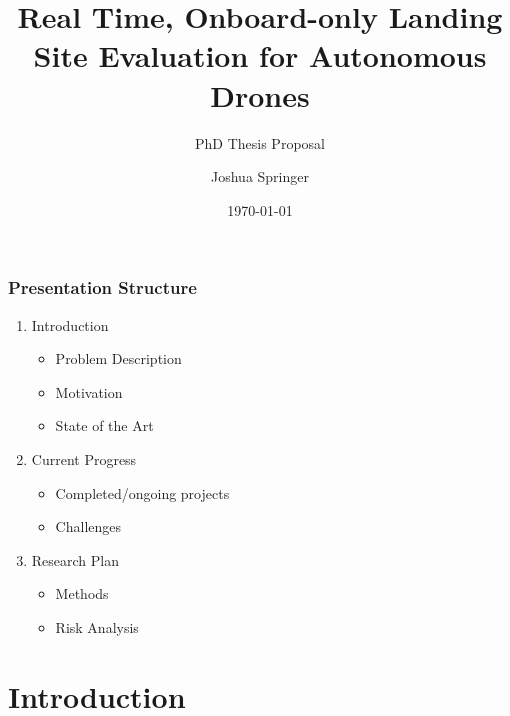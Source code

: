 \documentclass[aspectratio=169]{rubeamer}
\title[RU Presentation]{Real Time, Onboard-only Landing Site Evaluation for Autonomous Drones}
\subtitle[demo]{PhD Thesis Proposal}
\author[Springer]{Joshua Springer}
\institute[RU]{Reykjavík University}
\date[2022]{\monthyeardate\today}%
\begin{document}
\begin{frame}[plain]%
  \titlepage

\end{frame}

\begin{frame}
  \frametitle{Presentation Structure}
  \begin{enumerate}
    \item Introduction
      \begin{itemize}
        \item Problem Description
        \item Motivation
        \item State of the Art
      \end{itemize}
    \item Current Progress
      \begin{itemize}
        \item Completed/ongoing projects
        \item Challenges
      \end{itemize}
    \item Research Plan
      \begin{itemize}
        \item Methods
        \item Risk Analysis
      \end{itemize}
  \end{enumerate}
\end{frame}

\section{Introduction}
\end{document}
